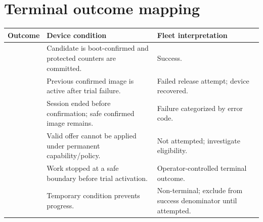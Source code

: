 \section{Terminal outcome mapping}

\begin{tabularx}{\textwidth}{@{}L{35mm}Y Y@{}}
  \toprule
  \textbf{Outcome} & \textbf{Device condition} & \textbf{Fleet interpretation} \\
  \midrule
   & Candidate is boot-confirmed and protected counters are committed. &
    Success. \\
   & Previous confirmed image is active after trial failure. &
    Failed release attempt; device recovered. \\
   & Session ended before confirmation; safe confirmed image remains. &
    Failure categorized by error code. \\
   & Valid offer cannot be applied under permanent capability/policy. &
    Not attempted; investigate eligibility. \\
   & Work stopped at a safe boundary before trial activation. &
    Operator-controlled terminal outcome. \\
   & Temporary condition prevents progress. &
    Non-terminal; exclude from success denominator until attempted. \\
  \bottomrule
\end{tabularx}
